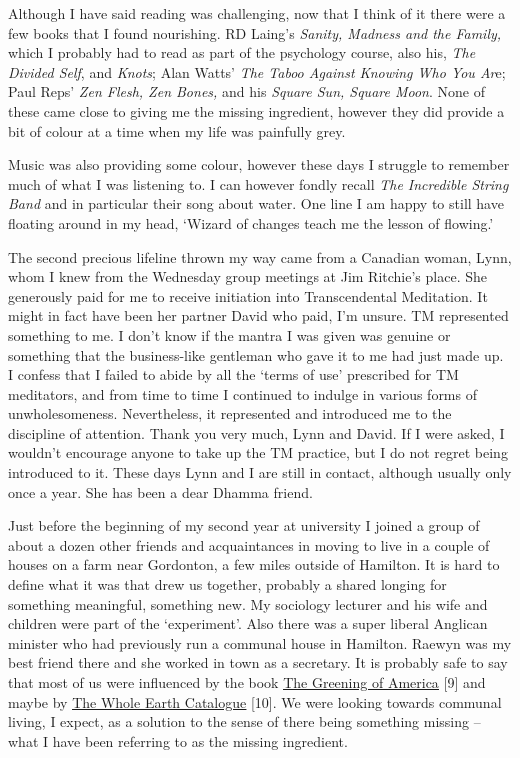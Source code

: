 Although I have said reading was challenging, now that I think of it
there were a few books that I found nourishing. RD Laing's \emph{Sanity,
Madness and the Family,} which I probably had to read as part of the
psychology course, also his, \emph{The Divided Self}, and \emph{Knots};
Alan Watts' \emph{The Taboo Against Knowing Who You Ar}e; Paul Reps'
\emph{Zen Flesh, Zen Bones,} and his \emph{Square Sun, Square Moon}.
None of these came close to giving me the missing ingredient, however
they did provide a bit of colour at a time when my life was painfully
grey.

Music was also providing some colour, however these days I struggle to
remember much of what I was listening to. I can however fondly recall
\emph{The Incredible String Band} and in particular their song about
water. One line I am happy to still have floating around in my head,
`Wizard of changes teach me the lesson of flowing.'

The second precious lifeline thrown my way came from a Canadian woman,
Lynn, whom I knew from the Wednesday group meetings at Jim Ritchie's
place. She generously paid for me to receive initiation into
Transcendental Meditation. It might in fact have been her partner David
who paid, I'm unsure. TM represented something to me. I don't know if
the mantra I was given was genuine or something that the business-like
gentleman who gave it to me had just made up. I confess that I failed to
abide by all the `terms of use' prescribed for TM meditators, and from
time to time I continued to indulge in various forms of unwholesomeness.
Nevertheless, it represented and introduced me to the discipline of
attention. Thank you very much, Lynn and David. If I were asked, I
wouldn't encourage anyone to take up the TM practice, but I do not
regret being introduced to it. These days Lynn and I are still in
contact, although usually only once a year. She has been a dear Dhamma
friend.

Just before the beginning of my second year at university I joined a
group of about a dozen other friends and acquaintances in moving to live
in a couple of houses on a farm near Gordonton, a few miles outside of
Hamilton. It is hard to define what it was that drew us together,
probably a shared longing for something meaningful, something new. My
sociology lecturer and his wife and children were part of the
`experiment'. Also there was a super liberal Anglican minister who had
previously run a communal house in Hamilton. Raewyn was my best friend
there and she worked in town as a secretary. It is probably safe to say
that most of us were influenced by the book
\href{https://en.wikipedia.org/wiki/The_Greening_of_America}{\underline{The
Greening of America}} {[}9{]} and maybe by
\href{https://www.theguardian.com/books/2013/may/05/stewart-brand-whole-earth-catalog}{\underline{The
Whole Earth Catalogue}} {[}10{]}. We were looking towards communal
living, I expect, as a solution to the sense of there being something
missing -- what I have been referring to as the missing ingredient.


